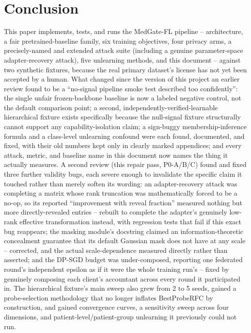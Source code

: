 \documentclass[11pt]{article}
\begin{document}
\section{Conclusion}
This paper implements, tests, and runs the MedGate-FL pipeline --
architecture, a fair pretrained-baseline family, six training objectives,
four privacy arms, a precisely-named and extended attack suite (including a
genuine parameter-space adapter-recovery attack), five unlearning methods,
and this document -- against two synthetic fixtures, because the real
primary dataset's license has not yet been accepted by a human. What
changed since the version of this project an earlier review found to be a
``no-signal pipeline smoke test described too confidently'': the single
unfair frozen-backbone baseline is now a labeled negative control, not the
default comparison point; a second, independently-verified-learnable
hierarchical fixture exists specifically because the null-signal fixture
structurally cannot support any capability-isolation claim; a sign-buggy
membership-inference formula and a class-level unlearning confound were
each found, documented, and fixed, with their old numbers kept only in
clearly marked appendices; and every attack, metric, and baseline name in
this document now names the thing it actually measures. A second review
(this repair pass, P0-A/B/C) found and fixed three further validity bugs,
each severe enough to invalidate the specific claim it touched rather than
merely soften its wording: an adapter-recovery attack was completing a
matrix whose rank truncation was mathematically forced to be a no-op, so
its reported ``improvement with reveal fraction'' measured nothing but more
directly-revealed entries -- rebuilt to complete the adapter's genuinely
low-rank effective transformation instead, with regression tests that fail
if this exact bug reappears; the masking module's docstring claimed an
information-theoretic concealment guarantee that its default Gaussian mask
does not have at any scale -- corrected, and the actual scale-dependence
measured directly rather than asserted; and the DP-SGD budget was
under-composed, reporting one federated round's independent epsilon as if
it were the whole training run's -- fixed by genuinely composing each
client's accountant across every round it participated in. The hierarchical
fixture's main sweep also grew from 2 to 5 seeds, gained a probe-selection
methodology that no longer inflates BestProbeRFC by construction, and
gained convergence curves, a sensitivity sweep across four dimensions, and
patient-level/patient-group unlearning it previously could not run.
\end{document}
